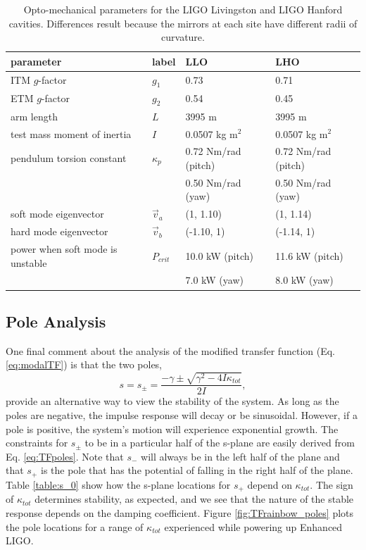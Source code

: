 \begin{table}
\centering
\caption[Opto-mechanical parameters for the LIGO Livingston and LIGO
Hanford cavities]{Opto-mechanical parameters for the LIGO Livingston and LIGO
  Hanford cavities. Differences result because the mirrors at each site have different
  radii of curvature.}
\begin{tabular}{l l l l}
\hline
parameter & label & LLO & LHO \\
\hline
ITM $g$-factor & $g_1$ & 0.73 & 0.71 \\
ETM $g$-factor & $g_2$ & 0.54 & 0.45 \\
arm length & $L$ & 3995 m & 3995 m \\
test mass moment of inertia & $I$ & 0.0507 kg m$^2$ &  0.0507 kg m$^2$ \\
pendulum torsion constant & $\kappa_p$ & 0.72 Nm/rad (pitch)& 0.72 Nm/rad (pitch) \\ 
& & 0.50 Nm/rad (yaw) & 0.50 Nm/rad (yaw) \\
soft mode eigenvector & $\vec{v}_a$ & (1, 1.10) & (1, 1.14) \\
hard mode eigenvector & $\vec{v}_b$ & (-1.10, 1) & (-1.14, 1) \\
power when soft mode is unstable & $P_{crit}$ & 10.0 kW (pitch) & 11.6 kW (pitch)\\
& & 7.0 kW (yaw) & 8.0 kW (yaw) \\
\hline
\end{tabular}
\label{table:optomech}
\end{table}


\subsection{Pole Analysis}
One final comment about the analysis of the modified transfer function
(Eq. \ref{eq:modalTF}) is that the two poles,
\begin{equation}
s = s_\pm = \frac{-\gamma \pm \sqrt{\gamma^2 - 4 I \kappa_{tot}}}{2 I},
\label{eq:TFpoles}
\end{equation}
provide an alternative way to view the stability of the system. As
long as the poles are negative, the impulse response will decay or be
sinusoidal. However, if a pole is positive, the system's motion will
experience exponential growth. The constraints for $s_\pm$ to be in a
particular half of the s-plane are easily derived from
Eq. \ref{eq:TFpoles}. Note that $s_-$ will always be in the left half
of the plane and that $s_+$ is the pole that has the potential of
falling in the right half of the plane. Table \ref{table:s_0} show how
the s-plane locations for $s_+$ depend on $\kappa_{tot}$. The sign of
$\kappa_{tot}$ determines stability, as expected, and we see that the
nature of the stable response depends on the damping
coefficient. Figure \ref{fig:TFrainbow_poles} plots the pole locations
for a range of $\kappa_{tot}$ experienced while powering up Enhanced
LIGO.

